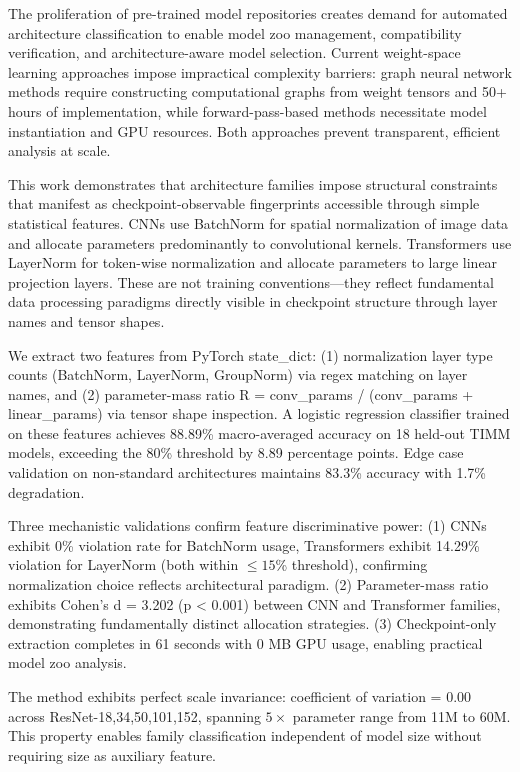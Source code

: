 
The proliferation of pre-trained model repositories creates demand for automated architecture classification to enable model zoo management, compatibility verification, and architecture-aware model selection. Current weight-space learning approaches impose impractical complexity barriers: graph neural network methods require constructing computational graphs from weight tensors and 50+ hours of implementation, while forward-pass-based methods necessitate model instantiation and GPU resources. Both approaches prevent transparent, efficient analysis at scale.

This work demonstrates that architecture families impose structural constraints that manifest as checkpoint-observable fingerprints accessible through simple statistical features. CNNs use BatchNorm for spatial normalization of image data and allocate parameters predominantly to convolutional kernels. Transformers use LayerNorm for token-wise normalization and allocate parameters to large linear projection layers. These are not training conventions---they reflect fundamental data processing paradigms directly visible in checkpoint structure through layer names and tensor shapes.

We extract two features from PyTorch state\_dict: (1) normalization layer type counts (BatchNorm, LayerNorm, GroupNorm) via regex matching on layer names, and (2) parameter-mass ratio R = conv\_params / (conv\_params + linear\_params) via tensor shape inspection. A logistic regression classifier trained on these features achieves 88.89\% macro-averaged accuracy on 18 held-out TIMM models, exceeding the 80\% threshold by 8.89 percentage points. Edge case validation on non-standard architectures maintains 83.3\% accuracy with 1.7\% degradation.

Three mechanistic validations confirm feature discriminative power: (1) CNNs exhibit 0\% violation rate for BatchNorm usage, Transformers exhibit 14.29\% violation for LayerNorm (both within $\leq 15$\% threshold), confirming normalization choice reflects architectural paradigm. (2) Parameter-mass ratio exhibits Cohen's d = 3.202 (p < 0.001) between CNN and Transformer families, demonstrating fundamentally distinct allocation strategies. (3) Checkpoint-only extraction completes in 61 seconds with 0 MB GPU usage, enabling practical model zoo analysis.

The method exhibits perfect scale invariance: coefficient of variation = 0.00 across ResNet-{18,34,50,101,152}, spanning $5\times$ parameter range from 11M to 60M. This property enables family classification independent of model size without requiring size as auxiliary feature.

